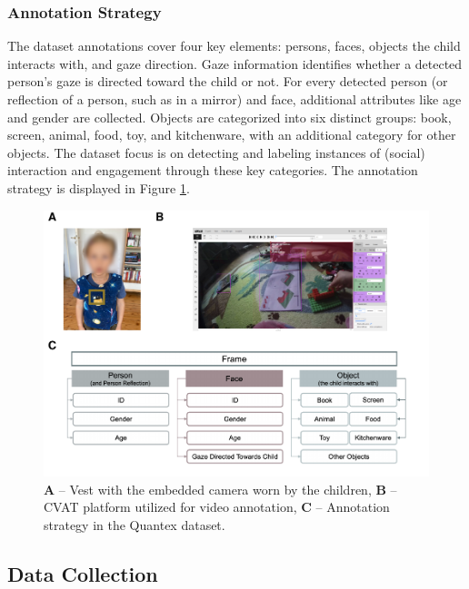 \documentclass[
  man,floatsintext]{apa6}
\begin{document}
\subsubsection{Annotation Strategy}\label{annotation-strategy}

The dataset annotations cover four key elements: persons, faces, objects the child interacts with, and gaze direction. Gaze information identifies whether a detected person's gaze is directed toward the child or not. For every detected person (or reflection of a person, such as in a mirror) and face, additional attributes like age and gender are collected. Objects are categorized into six distinct groups: book, screen, animal, food, toy, and kitchenware, with an additional category for other objects. The dataset focus is on detecting and labeling instances of (social) interaction and engagement through these key categories. The annotation strategy is displayed in Figure \ref{fig:camera-cvat-activity-classes}.

\begin{figure}

{\centering \includegraphics{Quantex_interaction_paper_files/figure-latex/camera-cvat-activity-classes-1} 

}

\caption{\textbf{A} – Vest with the embedded camera worn by the children, \textbf{B} – CVAT platform utilized for video annotation, \textbf{C} – Annotation strategy in the Quantex dataset.}\label{fig:camera-cvat-activity-classes}
\end{figure}

\subsection{Data Collection}\label{data-collection}
\end{document}
